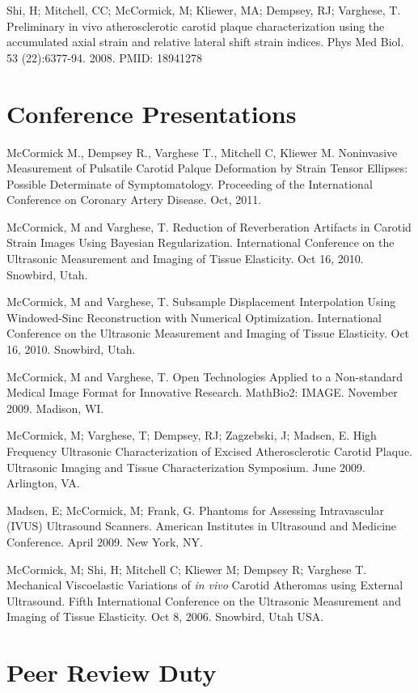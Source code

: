 \documentclass[margin,line]{res}
\begin{document}
\begin{resume}
Shi, H; Mitchell, CC; McCormick, M; Kliewer, MA; Dempsey, RJ; Varghese, T.
Preliminary in vivo atherosclerotic carotid plaque characterization
using the accumulated axial strain and relative lateral shift strain
indices.  Phys Med Biol. 53 (22):6377-94. 2008. PMID:
18941278

\section{\sc Conference Presentations}

McCormick M., Dempsey R., Varghese T., Mitchell C, Kliewer M.  Noninvasive
Measurement of Pulsatile Carotid Palque Deformation by Strain Tensor Ellipses:
Possible Determinate of Symptomatology.  Proceeding of the International
Conference on Coronary Artery Disease.  Oct, 2011.

McCormick, M and Varghese, T.  Reduction of Reverberation Artifacts in Carotid
Strain Images Using Bayesian Regularization.  International Conference on the
Ultrasonic Measurement and Imaging of Tissue Elasticity.  Oct 16, 2010.
Snowbird, Utah.

McCormick, M and Varghese, T.  Subsample Displacement Interpolation Using
Windowed-Sinc Reconstruction with Numerical Optimization.  International
Conference on the Ultrasonic Measurement and Imaging of Tissue Elasticity.  Oct
16, 2010.  Snowbird, Utah.

McCormick, M and Varghese, T.  Open Technologies Applied to a Non-standard Medical
Image Format for Innovative Research.  MathBio2: IMAGE.  November 2009.  Madison, WI.

McCormick, M; Varghese, T; Dempsey, RJ; Zagzebski, J; Madsen, E.  High Frequency Ultrasonic Characterization of Excised Atherosclerotic
Carotid Plaque.  Ultrasonic Imaging and Tissue Characterization
Symposium.  June 2009.  Arlington, VA.

Madsen, E;  McCormick, M;  Frank, G.  Phantoms for Assessing
Intravascular (IVUS) Ultrasound Scanners.  American Institutes in
Ultrasound and Medicine Conference.  April 2009.  New York, NY.

McCormick, M; Shi, H; Mitchell C; Kliewer M; Dempsey R; Varghese T.   Mechanical
Viscoelastic Variations of \textit{in vivo} Carotid Atheromas using External
Ultrasound.  Fifth International Conference on the Ultrasonic Measurement and
Imaging of Tissue Elasticity.  Oct 8, 2006.  Snowbird, Utah USA.


\section{\sc Peer Review Duty}


\end{resume}
\end{document}
